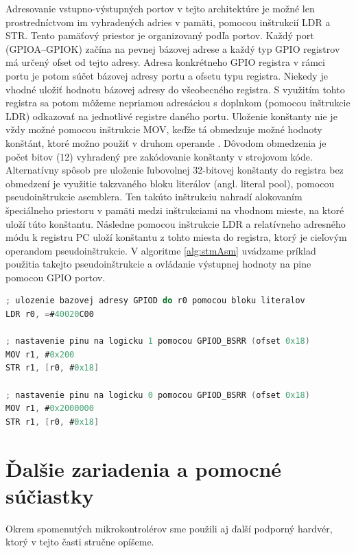 Adresovanie vstupno-výstupných portov v tejto architektúre je možné len prostredníctvom im vyhradených adries v pamäti, pomocou inštrukcií LDR a STR. Tento pamäťový priestor je organizovaný podľa portov. Každý port (GPIOA--GPIOK) začína na pevnej bázovej adrese a každý typ GPIO registrov má určený ofset od tejto adresy. Adresa konkrétneho GPIO registra v rámci portu je potom súčet bázovej adresy portu a ofsetu typu registra. Niekedy je vhodné uložiť hodnotu bázovej adresy do všeobecného registra. S využitím tohto registra sa potom môžeme nepriamou adresáciou s doplnkom (pomocou inštrukcie LDR) odkazovať na jednotlivé registre daného portu. Uloženie konštanty nie je vždy možné pomocou inštrukcie MOV, keďže tá obmedzuje možné hodnoty konštánt, ktoré možno použiť v druhom operande \cite{stmInstruction}. Dôvodom obmedzenia je počet bitov (12) vyhradený pre zakódovanie konštanty v strojovom kóde. Alternatívny spôsob pre uloženie ľubovolnej 32-bitovej konštanty do registra bez obmedzení je využitie takzvaného bloku literálov (angl. literal pool), pomocou pseudoinštrukcie asemblera. Ten takúto inštrukciu nahradí alokovaním špeciálneho priestoru v pamäti medzi inštrukciami na vhodnom mieste, na ktoré uloží túto konštantu. Následne pomocou inštrukcie LDR a relatívneho adresného módu k registru PC uloží konštantu z tohto miesta do registra, ktorý je cieľovým operandom pseudoinštrukcie. V algoritme \ref{alg:stmAsm} uvádzame príklad použitia takejto pseudoinštrukcie a ovládanie výstupnej hodnoty na pine pomocou GPIO portov.

\begin{lstlisting}[float,language=C,caption={Nastavenie hodnoty výstupneho pinu GPIOD 9 na STM32F4 v jazyku asembler. Pre uloženie bázovej adresy portu GPIOD použijeme blok literálov.}, label=alg:stmAsm]
; ulozenie bazovej adresy GPIOD do r0 pomocou bloku literalov
LDR r0, =#40020C00

; nastavenie pinu na logicku 1 pomocou GPIOD_BSRR (ofset 0x18)
MOV r1, #0x200 
STR r1, [r0, #0x18] 

; nastavenie pinu na logicku 0 pomocou GPIOD_BSRR (ofset 0x18)
MOV r1, #0x2000000
STR r1, [r0, #0x18]
\end{lstlisting}

\section{Ďalšie zariadenia a pomocné súčiastky}
Okrem spomenutých mikrokontrolérov sme použili aj ďalší podporný hardvér, ktorý v tejto časti stručne opíšeme.

